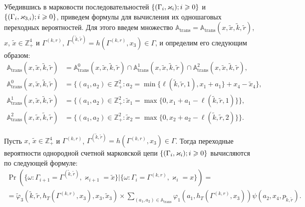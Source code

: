 \documentclass[a4paper,12pt,russian]{extarticle}
\newcommand{\Mark}{\{(\Gamma_i, \varkappa_i); \hm{} i \geqslant 0\}}
\newcommand{\MarkThree}{\{(\Gamma_i, \varkappa_{3,i}); \hm{} i \geqslant 0\}}
\begin{document}
Убедившись в марковости последовательностей $\Mark$ и $\MarkThree$, приведем формулы для вычисления их одношаговых переходных вероятностей. Для этого введем множество ${\mathbb A}_{\mathrm{trans}} = {\mathbb A}_{\mathrm{trans}}(x,\tilde{x},\tilde{k},\tilde{r})$, $x$, $\tilde{x}\in \mathbb{Z}_+^4$ и $\Gamma^{(k,r)}$, $\Gamma^{(\tilde{k},\tilde{r})}=h(\Gamma^{(k,r)},x_3) \in \Gamma$,  и определим его следующим образом:
\begin{align}
{\mathbb A}_{\mathrm{trans}}(x,\tilde{x},\tilde{k},\tilde{r}) &= {\mathbb A}_{\mathrm{trans}}^0(x,\tilde{x},\tilde{k},\tilde{r}) \cap {\mathbb A}_{\mathrm{trans}}^1(x,\tilde{x},\tilde{k},\tilde{r})\cap {\mathbb A}_{\mathrm{trans}}^2(x,\tilde{x},\tilde{k},\tilde{r}),\label{A:trans:1}\\
{\mathbb A}_{\mathrm{trans}}^0(x,\tilde{x},\tilde{k},\tilde{r}) &= \{(a_1,a_2) \in \mathbb{Z}_+^2 \colon a_2 = \min{\{\ell(\tilde{k},\tilde{r},1), x_1+a_1}\} +x_4-\tilde{x}_4\},\\
{\mathbb A}_{\mathrm{trans}}^1(x,\tilde{x},\tilde{k},\tilde{r}) &= \{(a_1,a_2) \in \mathbb{Z}_+^2 \colon \tilde{x}_1=\max{\{0,x_1+a_1-\ell(\tilde{k},\tilde{r},1)\}}\},\\
{\mathbb A}_{\mathrm{trans}}^2(x,\tilde{x},\tilde{k},\tilde{r}) &= \{(a_1,a_2) \in \mathbb{Z}_+^2 \colon  \tilde{x}_2=\max{\{0,x_2+a_2-\ell(\tilde{k},\tilde{r},2)\}}\}.\label{A:trans:2}
\end{align}
\begin{theorem}
Пусть $x$, $\tilde{x}\in \mathbb{Z}_+^4$ и $\Gamma^{(k,r)}$, $\Gamma^{(\tilde{k},\tilde{r})}=h(\Gamma^{(k,r)},x_3) \in \Gamma$. Тогда переходные вероятности однородной счетной марковской цепи $\Mark$ вычисляются по следующей формуле:
\begin{multline}
\Pr (\{\omega\colon \Gamma_{i+1}=\Gamma^{(\tilde{k},\tilde{r})},\varkappa_{i+1}=\tilde{x} \}| \{\omega\colon \Gamma_{i}=\Gamma^{(k,r)},\varkappa_i=x\})=\\ 
=\widetilde{\varphi}_3(\tilde{k},\tilde{r},h_T(\Gamma^{(k,r)},x_3),x_3,\tilde{x}_3)\times
\sum_{(a_1,a_2)\in {\mathbb A}_{\mathrm{trans}}}\varphi_1(a_1,h_T(\Gamma^{(k,r)},x_3))  \psi(a_2,x_4, p_{\tilde{k},\tilde{r}}).
\label{transitionToProve}
\end{multline}
\end{theorem}
\end{document}
